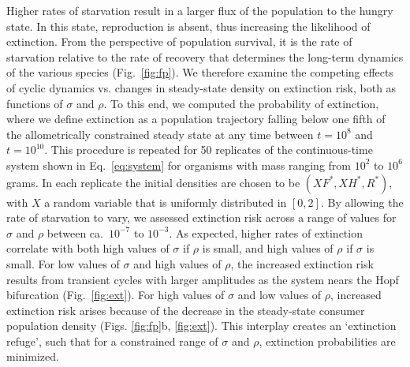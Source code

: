 \documentclass[twocolumn,preprintnumbers,amsmath,amssymb,superscriptaddress]{revtex4}
\begin{document}
Higher rates of starvation result in a larger flux of the population to the hungry state.
In this state, reproduction is absent, thus increasing the likelihood of extinction.  From the perspective of population survival, it is the rate of starvation relative to the rate of recovery that determines the long-term dynamics of the various species (Fig.~\ref{fig:fp}).
We therefore examine the competing effects of cyclic dynamics vs. changes in steady-state density on extinction risk, both as functions of $\sigma$ and $\rho$.
To this end, we computed the probability of extinction, where we define extinction as a population trajectory falling below one fifth of the allometrically constrained steady state at any time between $t=10^8$ and $t=10^{10}$.
This procedure is repeated for 50 replicates of the continuous-time system shown in Eq.~\ref{eq:system} for organisms with mass ranging from $10^2$ to $10^6$ grams.
In each replicate the initial densities are chosen to be $(XF^*,XH^*,R^*)$, with $X$ a random variable that is uniformly distributed in $[0,2]$.
By allowing the rate of starvation to vary, we assessed extinction risk across a range of values for $\sigma$ and $\rho$ between ca.\ $10^{-7}$ to $10^{-3}$. %
As expected, higher rates of extinction correlate with both high values of $\sigma$ if $\rho$ is small, and high values of $\rho$ if $\sigma$ is small.
For low values of $\sigma$ and high values of $\rho$, the increased extinction risk results from transient cycles with larger amplitudes as the system nears the Hopf bifurcation (Fig.~\ref{fig:ext}).
For high values of $\sigma$ and low values of $\rho$, increased extinction risk arises because of the decrease in the steady-state consumer population density (Figs. \ref{fig:fp}b, \ref{fig:ext}).
This interplay creates an `extinction refuge', such that for a constrained range of $\sigma$ and $\rho$, extinction probabilities are minimized.
\end{document}
